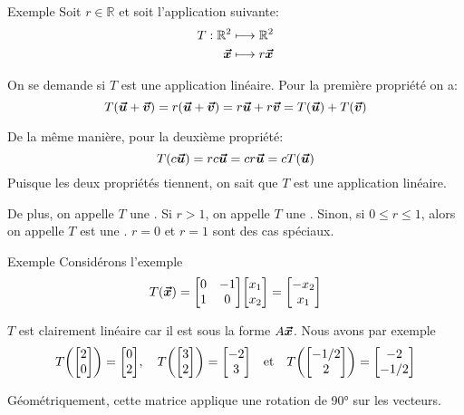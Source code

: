 \documentclass{article}
\begin{document}
\begin{parag}{Exemple}
    Soit $r \in \mathbb{R}$ et soit l'application suivante:
    \[\begin{split}
    T: \mathbb{R}^2 &\longmapsto \mathbb{R}^2 \\
    \bm{\protect\vec{x}} &\longmapsto r \bm{\protect\vec{x}}
    \end{split}\]

    On se demande si $T$ est une application linéaire. Pour la première propriété on a:
    \[T\left(\bvec{u} + \bvec{v}\right) = r\left(\bvec{u} + \bvec{v}\right) = r \bvec{u} + r \bvec{v} = T\left(\bvec{u}\right) + T\left(\bvec{v}\right)\]

    De la même manière, pour la deuxième propriété:
    \[T\left(c \bvec{u}\right) = r c \bvec{u} = c r \bvec{u} = cT\left(\bvec{u}\right)\]
    Puisque les deux propriétés tiennent, on sait que $T$ est une application linéaire.

    De plus, on appelle $T$ une . Si $r > 1$, on appelle $T$ une . Sinon, si $0 \leq r \leq 1$, alors on appelle $T$ est une . $r = 0$ et $r = 1$ sont des cas spéciaux.

\end{parag}

\begin{parag}{Exemple}
    Considérons l'exemple
    \[T\left(\bvec{x}\right) = \begin{bmatrix} 0 & -1 \\ 1 & 0 \end{bmatrix} \begin{bmatrix} x_1 \\ x_2 \end{bmatrix} = \begin{bmatrix} -x_2 \\ x_1 \end{bmatrix}\]

    $T$ est clairement linéaire car il est sous la forme $A \bm{\protect\vec{x}}$. Nous avons par exemple
    \[T\left(\begin{bmatrix} 2 \\ 0 \end{bmatrix}\right) = \begin{bmatrix} 0 \\ 2 \end{bmatrix}, \mathspace T\left(\begin{bmatrix} 3 \\ 2 \end{bmatrix}\right) = \begin{bmatrix} -2 \\ 3 \end{bmatrix} \mathspace \text{et} \mathspace T\left(\begin{bmatrix} -1/2 \\ 2 \end{bmatrix}\right) = \begin{bmatrix} -2 \\ -1/2 \end{bmatrix} \]

    Géométriquement, cette matrice applique une rotation de 90° sur les vecteurs.
\end{parag}
\end{document}

